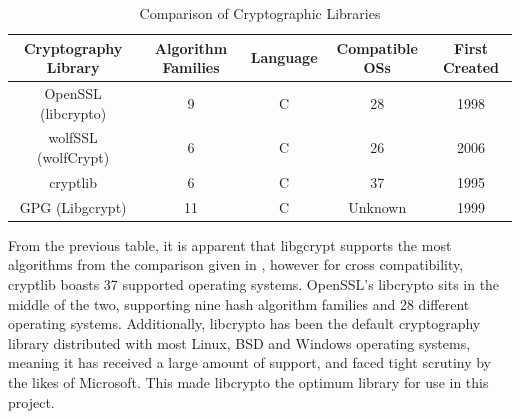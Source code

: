 \documentclass[a4paper, 11pt]{report}
\begin{document}
\begin{table}[H]
\centering
\begin{tabular}{ |c|c|c|c|c| } 
\hline
Cryptography Library & Algorithm Families & Language & Compatible OSs & First Created\\
\hline
OpenSSL (libcrypto)\cite{libcrypto} & 9 & C & 28 & 1998\\
wolfSSL (wolfCrypt)\cite{wolfCrypt} & 6 & C & 26 & 2006\\
cryptlib\cite{cryptlib} & 6 & C & 37 & 1995\\
GPG (Libgcrypt)\cite{libgcrypt} & 11 & C & Unknown & 1999\\
\hline
\end{tabular}
\caption{Comparison of Cryptographic Libraries}
\label{tab:cryptolib}
\end{table}

From the previous table, it is apparent that libgcrypt supports the most algorithms from the comparison given in \cite{hashlibcomp}, however for cross compatibility, cryptlib boasts 37 supported operating systems. OpenSSL's libcrypto sits in the middle of the two, supporting nine hash algorithm families and 28 different operating systems. Additionally, libcrypto has been the default cryptography library distributed with most Linux, BSD and Windows operating systems, meaning it has received a large amount of support, and faced tight scrutiny by the likes of Microsoft. This made libcrypto the optimum library for use in this project. 
\end{document}
